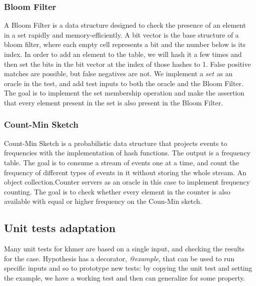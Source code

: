 \documentclass[preprint,nocopyrightspace]{sig-alternate}
\begin{document}
\subsubsection{Bloom Filter}
A Bloom Filter is a data structure designed to check the presence of an element in a set rapidly and memory-efficiently.
A bit vector is the base structure of a bloom filter,
where each empty cell represents a bit and the number below is its index.\citet{bloom_filter}
In order to add an element to the table,
we will hash it a few times and then set the bits in the bit vector at the index of those hashes to 1.
False positive matches are possible,
but false negatives are not.
We implement a $set$ as an oracle in the test, and add test inputs to both the oracle and the Bloom Filter.
The goal is to implement the set membership operation and make the assertion that every element present in 
the set is also present in the Bloom Filter.

\subsubsection{Count-Min Sketch}
Count-Min Sketch is a probabilistic data structure that projects events to frequencies with the implementation of hash functions.
The output is a frequency table.\citet{count_min_sketch}
The goal is to consume a stream of events one at a time,
and count the frequency of different types of events in it without storing the whole stream.\citet{count_min_sketch_2005}
An object collection.Counter servers as an oracle in this case to implement frequency counting.
The goal is to check whether every element in the counter is also available with equal or higher frequency on the Coun-Min sketch.

\subsection{Unit tests adaptation}
Many unit tests for khmer are based on a single input,
and checking the results for the case.
Hypothesis has a decorator,
\emph{@example},
that can be used to run specific inputs and so to prototype new tests:
by copying the unit test and setting the example,
we have a working test and then can generalize for some property.
\end{document}
